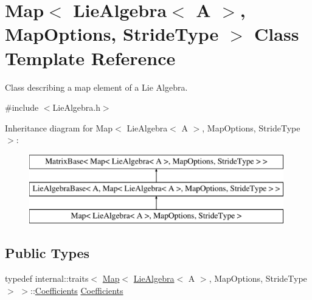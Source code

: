 \hypertarget{class_map_3_01_lie_algebra_3_01_a_01_4_00_01_map_options_00_01_stride_type_01_4}{}\section{Map$<$ Lie\+Algebra$<$ A $>$, Map\+Options, Stride\+Type $>$ Class Template Reference}
\label{class_map_3_01_lie_algebra_3_01_a_01_4_00_01_map_options_00_01_stride_type_01_4}


Class describing a map element of a Lie Algebra.  




{\ttfamily \#include $<$Lie\+Algebra.\+h$>$}

Inheritance diagram for Map$<$ Lie\+Algebra$<$ A $>$, Map\+Options, Stride\+Type $>$\+:\begin{figure}[H]
\begin{center}
\leavevmode
\includegraphics[height=3.000000cm]{class_map_3_01_lie_algebra_3_01_a_01_4_00_01_map_options_00_01_stride_type_01_4}
\end{center}
\end{figure}
\subsection*{Public Types}
\begin{DoxyCompactItemize}
\item 
typedef internal\+::traits$<$ \hyperlink{class_map_3_01_lie_algebra_3_01_a_01_4_00_01_map_options_00_01_stride_type_01_4_a5e320dd14d4d47929d7a4d48014a735f}{Map}$<$ \hyperlink{class_lie_algebra}{Lie\+Algebra}$<$ A $>$, Map\+Options, Stride\+Type $>$ $>$\+::\hyperlink{class_map_3_01_lie_algebra_3_01_a_01_4_00_01_map_options_00_01_stride_type_01_4_a32e1cab48693733071a98e9f558d4c82}{Coefficients} \hyperlink{class_map_3_01_lie_algebra_3_01_a_01_4_00_01_map_options_00_01_stride_type_01_4_a32e1cab48693733071a98e9f558d4c82}{Coefficients}
\end{DoxyCompactItemize}

